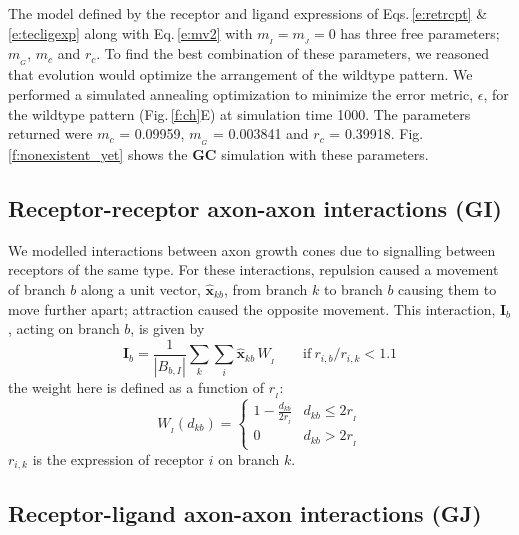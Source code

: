 \documentclass[11pt, a4paper]{article}
\begin{document}
The model defined by the receptor and ligand expressions of Eqs.\,\ref{e:retrcpt}
\& \ref{e:tecligexp} along with Eq.\,\ref{e:mv2} with $m_{\!_I}=m_{\!_J}=0$ has three
free parameters; $m_{\!_G}$, $m_c$ and $r_c$. To find the best combination of
these parameters, we reasoned that evolution would optimize the arrangement of
the wildtype pattern. We performed a simulated annealing optimization to
minimize the error metric, $\epsilon$, for the wildtype pattern
(Fig.\,\ref{f:ch}E) at simulation time 1000. The parameters returned were
$m_c$ = 0.09959, $m_{\!_G}$ = 0.003841 and $r_c$ =
0.39918. Fig.\,\ref{f:nonexistent_yet} shows the $\mathbf{GC}$ simulation with
these parameters.

\subsection*{Receptor-receptor axon-axon interactions (GI)}

We modelled interactions between axon growth cones due to signalling between
receptors of the same type. For these interactions, repulsion caused a
movement of branch $b$ along a unit vector, $\hat{\mathbf{x}}_{kb}$, from
branch $k$ to branch $b$ causing them to move further apart; attraction caused
the opposite movement. This interaction, $\mathbf{I}_b$, acting on branch $b$,
is given by
%
\begin{equation}
\mathbf{I}_b
= \frac{1}{|B_{b,I}|} \sum_k \sum_i \hat{\mathbf{x}}_{kb}\,W_{\!_I} \qquad \mathrm{if}~r_{i,b}
/ r_{i,k} < 1.1
\end{equation}
%
the weight here is defined as a function of $r_{\!_I}$:
%
\begin{equation}
W_{\!_I}(d_{kb}) = \begin{cases}
      1 - \frac{d_{kb}}{2r_{\!_I}}   & d_{kb} \leq 2r_{\!_I} \\
     0 & d_{kb} > 2r_{\!_I}
     \end{cases}
\end{equation}
$r_{i,k}$ is the expression of receptor $i$ on branch $k$.

\subsection*{Receptor-ligand axon-axon interactions (GJ)}
\end{document}
